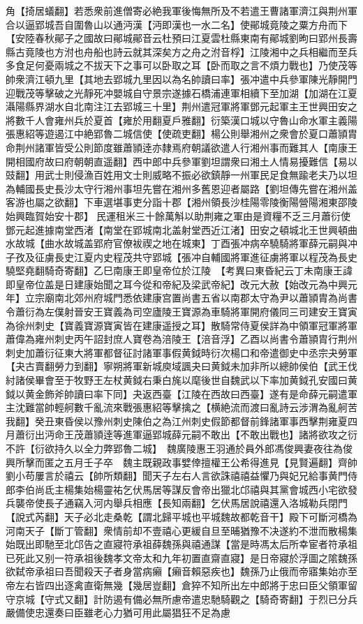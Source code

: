 角【掎居蟻翻】若悉衆前進僧寄必絶我軍後悔無所及不若遣王曹諸軍濟江與荆州軍合以逼郢城吾自圍魯山以通沔漢【沔即漢也一水二名】使鄖城竟陵之粟方舟而下【安陸春秋鄖子之國故曰鄖城鄖音云杜預曰江夏雲杜縣東南有鄖城劉昫曰郢州長壽縣古竟陵也方泭也舟船也詩云就其深矣方之舟之泭音桴】江陵湘中之兵相繼而至兵多食足何憂兩城之不拔天下之事可以卧取之耳【卧而取之言不煩力戰也】乃使茂等帥衆濟江頓九里【其地去郢城九里因以為名帥讀曰率】張冲遣中兵參軍陳光靜開門迎戰茂等擊破之光靜死冲嬰城自守景宗遂據石橋浦連軍相續下至加湖【加湖在江夏灄陽縣界湖水自北南注江去郢城三十里】荆州遣冠軍將軍鄧元起軍主王世興田安之將數千人會雍州兵於夏首【雍於用翻夏戶雅翻】衍築漢口城以守魯山命水軍主義陽張惠紹等遊遏江中絶郢魯二城信使【使疏吏翻】楊公則舉湘州之衆會於夏口蕭頴胄命荆州諸軍皆受公則節度雖蕭頴逹亦隸焉府朝議欲遣人行湘州事而難其人【南康王開相國府故曰府朝朝直遥翻】西中郎中兵參軍劉坦謂衆曰湘土人情易擾難信【易以豉翻】用武士則侵漁百姓用文士則威略不振必欲鎮靜一州軍民足食無踰老夫乃以坦為輔國長史長沙太守行湘州事坦先嘗在湘州多舊恩迎者屬路【劉坦傳先嘗在湘州盖客游也屬之欲翻】下車選堪事吏分詣十郡【湘州領長沙桂陽零陵衡陽營陽湘東邵陵始興臨賀始安十郡】民運租米三十餘萬斛以助荆雍之軍由是資糧不乏三月蕭衍使鄧元起進據南堂西渚【南堂在郢城南北盖射堂西近江渚】田安之頓城北王世興頓曲水故城【曲水故城盖郢府官僚袚禊之地在城東】丁酉張冲病卒驍騎將軍薛元嗣與冲子孜及征虜長史江夏内史程茂共守郢城【張冲自輔國將軍進征虜將軍以程茂為長史驍堅堯翻騎奇寄翻】乙巳南康王即皇帝位於江陵　【考異曰東昏紀云丁未南康王諱即皇帝位盖是日建康始聞之耳今從和帝紀及梁武帝紀】改元大赦【始改元為中興元年】立宗廟南北郊州府城門悉依建康宫置尚書五省以南郡太守為尹以蕭頴胄為尚書令蕭衍為左僕射晉安王寶義為司空廬陵王寶源為車騎將軍開府儀同三司建安王寶寅為徐州刺史【寶義寶源寶寅皆在建康遥授之耳】散騎常侍夏侯詳為中領軍冠軍將軍蕭偉為雍州刺史丙午詔封庶人寶卷為涪陵王【涪音浮】乙酉以尚書令蕭頴胄行荆州刺史加蕭衍征東大將軍都督征討諸軍事假黄鉞時衍次楊口和帝遣御史中丞宗夬勞軍【夬古賣翻勞力到翻】寧朔將軍新城庾域諷夬曰黄鉞未加非所以總帥侯伯【武王伐紂諸侯畢會至于牧野王左杖黄鉞右秉白旄以麾後世自魏武以下率加黄鉞孔安國曰黄鉞以黄金飾斧帥讀曰率下同】夬返西臺【江陵在西故曰西臺】遂有是命薛元嗣遣軍主沈難當帥輕舸數千亂流來戰張惠紹等擊擒之【横絶流而渡曰亂詩云涉渭為亂舸苦我翻】癸丑東昏侯以豫州刺史陳伯之為江州刺史假節都督前鋒諸軍事西擊荆雍夏四月蕭衍出沔命王茂蕭頴逹等進軍逼郢城薛元嗣不敢出【不敢出戰也】諸將欲攻之衍不許【衍欲持久以全力弊郢魯二城】　魏廣陵惠王羽通於員外郎馮俊興妻夜往為俊興所擊而匿之五月壬子卒　魏主既親政事嬖倖擅權王公希得進見【見賢遍翻】齊帥劉小苟屢言於禧云【帥所類翻】聞天子左右人言欲誅禧禧益懼乃與妃兄給事黄門侍郎李伯尚氐主楊集始楊靈祐乞伏馬居等謀反會帝出獵北邙禧與其黨會城西小宅欲發兵襲帝使長子通竊入河内舉兵相應【長知兩翻】乞伏馬居說禧還入洛城勒兵閉門【說式芮翻】天子必北走桑乾【謂北歸平城也平城魏故都乾音干】殿下可斷河橋為河南天子【斷丁管翻】衆情前却不壹禧心更緩自旦至晡猶豫不决遂約不泄而散楊集始既出即馳至北邙告之直寢符承祖薛魏孫與禧通謀【當是時馮太后所幸宦者符承祖已死此又别一符承祖後魏孝文帝太和九年初置直齋直寢】是日帝寢於浮圖之隂魏孫欲弑帝承祖曰吾聞殺天子者身當病癩【癩音賴惡疾也】魏孫乃止俄而帝寤集始亦至帝左右皆四出逐禽直衛無幾【幾居豈翻】倉猝不知所出左中郎將于忠曰臣父領軍留守京城【守式又翻】計防遏有備必無所慮帝遣忠馳騎觀之【騎奇寄翻】于烈已分兵嚴備使忠還奏曰臣雖老心力猶可用此屬猖狂不足為慮